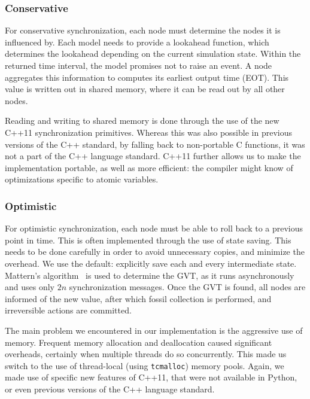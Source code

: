 \subsubsection{Conservative}
For conservative synchronization, each node must determine the nodes it is influenced by.
Each model needs to provide a lookahead function, which determines the lookahead depending on the current simulation state.
Within the returned time interval, the model promises not to raise an event.
A node aggregates this information to computes its earliest output time (EOT).
This value is written out in shared memory, where it can be read out by all other nodes.

Reading and writing to shared memory is done through the use of the new C++11 synchronization primitives.
Whereas this was also possible in previous versions of the C++ standard, by falling back to non-portable C functions, it was not a part of the C++ language standard.
C++11 further allows us to make the implementation portable, as well as more efficient: the compiler might know of optimizations specific to atomic variables.

\subsubsection{Optimistic}
For optimistic synchronization, each node must be able to roll back to a previous point in time.
This is often implemented through the use of state saving.
This needs to be done carefully in order to avoid unnecessary copies, and minimize the overhead.
We use the default: explicitly save each and every intermediate state.
Mattern's algorithm~\cite{mattern} is used to determine the GVT, as it runs asynchronously and uses only $2n$ synchronization messages.
Once the GVT is found, all nodes are informed of the new value, after which fossil collection is performed, and irreversible actions are committed.

The main problem we encountered in our implementation is the aggressive use of memory.
Frequent memory allocation and deallocation caused significant overheads, certainly when multiple threads do so concurrently.
This made us switch to the use of thread-local (using \texttt{tcmalloc}) memory pools.
Again, we made use of specific new features of C++11, that were not available in Python, or even previous versions of the C++ language standard.

